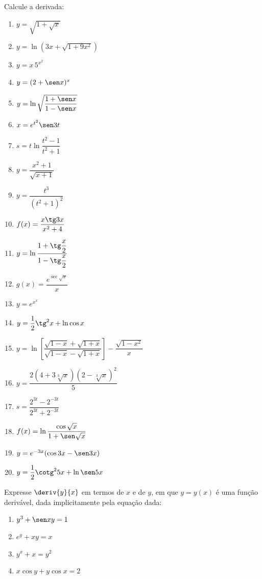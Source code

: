 \begin{exercicio}[2]
\label{ex:7.17.2}
Calcule a derivada:
\begin{enumerate}[label=\alph*)]
    \item $y = \sqrt{1 + \sqrt{x}}$
    \item $y = \ln(3x + \sqrt{1 + 9x^2})$
    \item $y = x\,5^{x^2}$
    \item $y = (2 + \sen x)^x$
    \item $y = \ln\sqrt{\dfrac{1 + \sen x}{1 - \sen x}}$
    \item $x = e^{t^2}\sen 3t$
    \item $s = t\ln\dfrac{t^2 - 1}{t^2 + 1}$
    \item $y = \dfrac{x^2 + 1}{\sqrt{x + 1}}$
    \item $y = \dfrac{t^3}{(t^2 + 1)^2}$
    \item $f(x) = \dfrac{x\tg 3x}{x^2 + 4}$
    \item $y = \ln\dfrac{1 + \tg\dfrac{x}{2}}{1 - \tg\dfrac{x}{2}}$
    \item $g(x) = \dfrac{e^{\sec\sqrt{x}}}{x}$
    \item $y = e^{x^x}$
    \item $y = \dfrac{1}{2}\tg^2 x + \ln\cos x$
    \item $y = \ln\!\left[\dfrac{\sqrt{1 - x} + \sqrt{1 + x}}{\sqrt{1 - x} - \sqrt{1 + x}}\right] - \dfrac{\sqrt{1 - x^2}}{x}$
    \item $y = \dfrac{2(4 + 3\sqrt[3]{x})(2 - \sqrt[3]{x})^2}{5}$
    \item $s = \dfrac{2^{3t} - 2^{-3t}}{2^{3t} + 2^{-3t}}$
    \item $f(x) = \ln\dfrac{\cos\sqrt{x}}{1 + \sen\sqrt{x}}$
    \item $y = e^{-3x}(\cos 3x - \sen 3x)$
    \item $y = \dfrac{1}{2}\cotg^2 5x + \ln\sen 5x$
\end{enumerate}
\end{exercicio}

\begin{exercicio}[3]
\label{ex:7.17.3}
Expresse $\deriv{y}{x}$ em termos de $x$ e de $y$, em que $y = y(x)$ é uma função derivável, dada implicitamente pela equação dada:
\begin{enumerate}[label=\alph*)]
    \item $y^3 + \sen xy = 1$
    \item $e^y + xy = x$
    \item $y^x + x = y^2$
    \item $x\cos y + y\cos x = 2$
\end{enumerate}
\end{exercicio}

